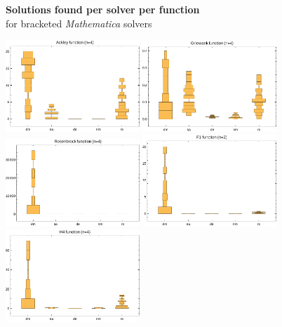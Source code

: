 \documentclass[12pt]{article}
\begin{document}
\begin{figure}[H]
    \begin{center}
        {\large {\bfseries Solutions found per solver per function}\\
        for bracketed \emph{Mathematica} solvers}

        \includegraphics[width=0.45\textwidth]{../figures/ackley-good.pdf}
        \includegraphics[width=0.45\textwidth]{../figures/griewank-good.pdf}
        \includegraphics[width=0.45\textwidth]{../figures/rosenbrock-good.pdf}
        \includegraphics[width=0.45\textwidth]{../figures/f1-good.pdf}
        \includegraphics[width=0.45\textwidth]{../figures/h4-good.pdf}


\end{center}
\end{figure}
\end{document}
